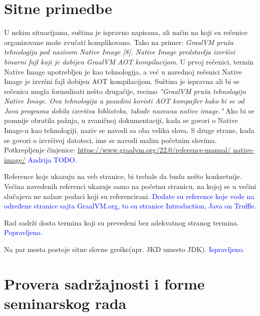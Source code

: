 \documentclass[a4paper]{report}
\newcommand{\odgovor}[1]{\textcolor{blue}{#1}}
\begin{document}
\section{Sitne primedbe}
U nekim situacijama, suština je ispravno napisana, ali način na koji su rečenice organizovane može zvučati komplikovano. Tako na primer: 
\textit{GraalVM pruža tehnologiju pod nazivom Native Image [8]. Native Image predstavlja izvršivi binarni fajl koji je dobijen GraalVM AOT 
kompilacijom}. U prvoj rečenici, termin Native Image upotrebljen je kao tehnologija, a već u narednoj rečenici Native Image je izvršni fajl 
dobijen AOT kompilacijom. Suština je ispravna ali bi se rečenica mogla formulisati nešto drugačije, recimo \textit{"GraalVM pruža tehnologiju 
Native Image. Ova tehnologija u pozadini koristi AOT kompajler kako bi se od Java programa dobila izvršiva biblioteka, takođe nazvana native 
image."} Ako bi se pomnije obratila pažnja, u zvaničnoj dokumentaciji, kada se govori o Native Image-u kao tehnologiji, naziv se navodi sa oba 
velika slova. S druge strane, kada se govori o izvršivoj datoteci, ime se navodi malim početnim slovima. 
Potkrepljenje činjenice: \href{https://www.graalvm.org/22.0/reference-manual/native-image/}{https://www.graalvm.org/22.0/reference-manual/
native-image/} \odgovor{Andrija TODO.}

\indent Reference koje ukazuju na veb stranice, bi trebale da budu nešto konkretnije. Većina navedenih referenci ukazuje samo na početnu stranicu, na kojoj se u većini slučajeva ne nalaze podaci koji su referencirani.  \odgovor{Dodate su reference koje vode na određene stranice sajta GraalVM.org, to su stranice Introduction, Java on Truffle.}

\indent Rad sadrži dosta termina koji su prevedeni bez adekvatnog stranog termina. \odgovor{Popravljeno.}

\indent Na par mesta postoje sitne slovne greške(npr. JKD umesto JDK). \odgovor{Ispravljeno.}

\section{Provera sadržajnosti i forme seminarskog rada}
\end{document}
